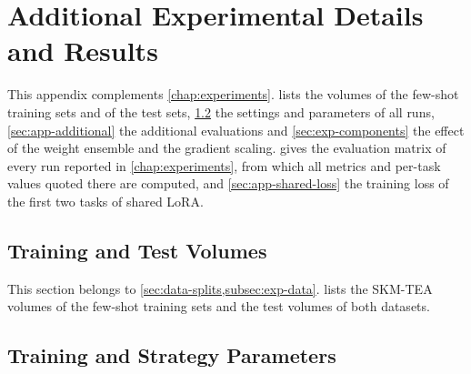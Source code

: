 
\chapter{Additional Experimental Details and Results}
\label{app:results}

This appendix complements \cref{chap:experiments}.
 lists the volumes of the few-shot training sets and of the test sets, \cref{sec:app-params} the settings and parameters of all runs, \cref{sec:app-additional} the additional evaluations and \cref{sec:exp-components} the effect of the weight ensemble and the gradient scaling.
 gives the evaluation matrix of every run reported in \cref{chap:experiments}, from which all metrics and per-task values quoted there are computed, and \cref{sec:app-shared-loss} the training loss of the first two tasks of shared LoRA.

\section{Training and Test Volumes}
\label{sec:app-volumes}

This section belongs to \cref{sec:data-splits,subsec:exp-data}.
 lists the SKM-TEA volumes of the few-shot training sets and the test volumes of both datasets.

\begin{table}[tb]
\centering
\caption[Few-shot training volumes and test volumes]{Few-shot training volumes and test volumes, named as in the dataset releases: SKM-TEA volumes by their scan identifier, AeroPath volumes by their case number. The full training split contains 108 SKM-TEA volumes.}
\label{tab:app-volumes}

\end{table}

\FloatBarrier
\section{Training and Strategy Parameters}
\label{sec:app-params}


